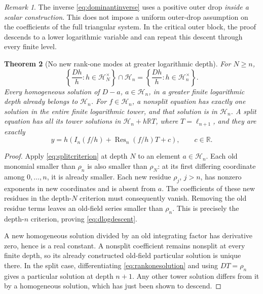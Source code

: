 \documentclass[11pt,a4paper]{article}
\numberwithin{equation}{section}
\newtheorem{theorem}{Theorem}[section]
\theoremstyle{definition}
\theoremstyle{remark}\newtheorem{remark}[theorem]{Remark}
\newcommand{\R}{\mathbb R}\newcommand{\C}{\mathbb C}
\newcommand{\Hh}{\mathcal H}\newcommand{\Ll}{\mathcal L}
\newcommand{\Res}{\operatorname{Res}}\newcommand{\supp}{\operatorname{supp}}
\begin{document}
\begin{remark}
The inverse \eqref{eq:dominantinverse} uses a positive outer drop \emph{inside a scalar construction}. This does not impose a uniform outer-drop assumption on the coefficients of the full triangular system. In the critical outer block, the proof descends to a lower logarithmic variable and can repeat this descent through every finite level.
\end{remark}

\begin{theorem}[No new rank-one modes at greater logarithmic depth]
\label{thm:descent}
For $N\ge n$,
\begin{equation}
 \left\{\frac{Dh}{h}:h\in\Hh_N^\times\right\}\cap\Hh_n
 =\left\{\frac{Dh}{h}:h\in\Hh_n^\times\right\}.
 \label{eq:dlogdescent}
\end{equation}
Every homogeneous solution of $D-a$, $a\in\Hh_n$, in a greater finite logarithmic depth already belongs to $\Hh_n$. For $f\in\Hh_n$, a nonsplit equation has exactly one solution in the entire finite logarithmic tower, and that solution is in $\Hh_n$. A split equation has all its tower solutions in $\Hh_n+h\R T$, where $T=\ell_{n+1}$, and they are exactly
\begin{equation}
 y=h\left(I_n(f/h)+\Res_n(f/h)T+c\right),\qquad c\in\R.
 \label{eq:rankonesolution}
\end{equation}
\end{theorem}
\begin{proof}
Apply \eqref{eq:splitcriterion} at depth $N$ to an element $a\in\Hh_n$. Each old monomial smaller than $\rho_n$ is also smaller than $\rho_N$: at its first differing coordinate among $0,\ldots,n$, it is already smaller. Each new residue $\rho_j$, $j>n$, has nonzero exponents in new coordinates and is absent from $a$. The coefficients of these new residues in the depth-$N$ criterion must consequently vanish. Removing the old residue terms leaves an old-field series smaller than $\rho_n$. This is precisely the depth-$n$ criterion, proving \eqref{eq:dlogdescent}.

A new homogeneous solution divided by an old integrating factor has derivative zero, hence is a real constant. A nonsplit coefficient remains nonsplit at every finite depth, so its already constructed old-field particular solution is unique there. In the split case, differentiating \eqref{eq:rankonesolution} and using $DT=\rho_n$ gives a particular solution at depth $n+1$. Any other tower solution differs from it by a homogeneous solution, which has just been shown to descend.
\end{proof}
\end{document}

